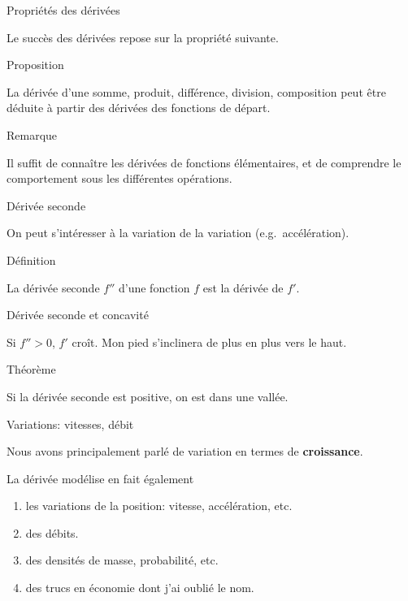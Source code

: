 \documentclass{beamer}
\begin{document}
\begin{frame}
    {Propriétés des dérivées}

    Le succès des dérivées repose sur la propriété suivante.
    \begin{exampleblock}
        {Proposition}

        La dérivée d'une somme, produit, différence, division, composition peut être déduite à partir des dérivées des fonctions de départ.
    \end{exampleblock}
    \pause{}

    \begin{alertblock}
        {Remarque}

        Il suffit de connaître les dérivées de fonctions élémentaires,
        et de comprendre le comportement sous les différentes opérations.
    \end{alertblock}
\end{frame}

\begin{frame}
    {Dérivée seconde}

    On peut s'intéresser à la variation de la variation (e.g.\ accélération).
    \begin{exampleblock}
        {Définition}

        La dérivée seconde $f''$ d'une fonction $f$ est la dérivée de $f'$.
    \end{exampleblock}
\end{frame}

\begin{frame}
    {Dérivée seconde et concavité}

    Si $f'' > 0$, $f'$ croît.
    Mon pied s'inclinera de plus en plus vers le haut.

    \begin{exampleblock}
        {Théorème}

        Si la dérivée seconde est positive,
        on est dans une vallée.
    \end{exampleblock}

    \begin{plot}{0.25}{-10}{-2}{10}{10}
    \end{plot}
\end{frame}

\begin{frame}
    {Variations: vitesses, débit}

    Nous avons principalement parlé de variation en termes de \textbf{croissance}.

    La dérivée modélise en fait également
    \begin{enumerate}
        \item les variations de la position: vitesse, accélération, etc.
            \pause{}
        \item des débits.
            \pause{}
        \item des densités de masse, probabilité, etc.
            \pause{}
        \item des trucs en économie dont j'ai oublié le nom.
    \end{enumerate}
\end{frame}
\end{document}
